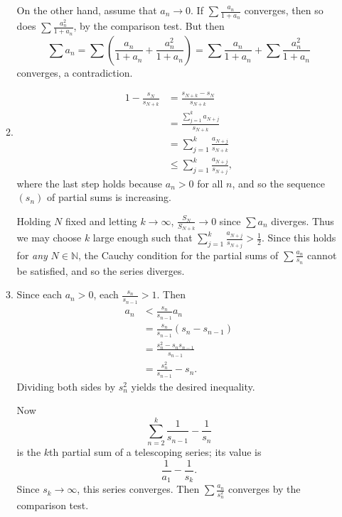 \documentclass{article}
\begin{document}
\begin{enumerate}[label=\textbf{\arabic*.}]
\begin{enumerate}
On the other hand, assume that $a_n\to 0$. If $\sum\frac{a_n}{1+a_n}$ converges, then so does $\sum\frac{a_n^2}{1+a_n}$, by the comparison test. But then \[\sum a_n = \sum\left(\frac{a_n}{1+a_n} + \frac{a_n^2}{1+a_n}\right) = \sum\frac{a_n}{1+a_n} + \sum\frac{a_n^2}{1+a_n}\] converges, a contradiction.
\item \begin{align*}
1 - \frac{s_N}{s_{N+k}} &= \frac{s_{N+k}-s_N}{s_{N+k}}\\
	&= \frac{\sum_{j=1}^k a_{N+j}}{s_{N+k}}\\
	&= \sum_{j=1}^k \frac{a_{N+j}}{s_{N+k}}\\
	&\leq \sum_{j=1}^k \frac{a_{N+j}}{s_{N+j}},
\end{align*}
where the last step holds because $a_n > 0$ for all $n$, and so the sequence $(s_n)$ of partial sums is increasing.

Holding $N$ fixed and letting $k\to\infty$, $\frac{S_N}{S_{N+k}}\to 0$ since $\sum a_n$ diverges. Thus we may choose $k$ large enough such that $\sum_{j=1}^k \frac{a_{N+j}}{s_{N+j}} > \frac{1}{2}$. Since this holds for \textit{any} $N\in\mathbb N$, the Cauchy condition for the partial sums of $\sum \frac{a_n}{s_n}$ cannot be satisfied, and so the series diverges.
\item Since each $a_n > 0$, each $\frac{s_n}{s_{n-1}} > 1$. Then
\begin{align*}
a_n &< \frac{s_n}{s_{n-1}} a_n\\
	&= \frac{s_n}{s_{n-1}}(s_n - s_{n-1})\\
	&= \frac{s_n^2 - s_n s_{n-1}}{s_{n-1}}\\
	&= \frac{s_n^2}{s_{n-1}} - s_n.
\end{align*}
Dividing both sides by $s_n^2$ yields the desired inequality.

Now \[\sum_{n=2}^k \frac{1}{s_{n-1}} - \frac{1}{s_n}\] is the $k$th partial sum of a telescoping series; its value is \[\frac{1}{a_1} - \frac{1}{s_k}.\] Since $s_k\to\infty$, this series converges. Then $\sum\frac{a_n}{s_n^2}$ converges by the comparison test.
\end{enumerate}
\end{enumerate}
\end{document}
